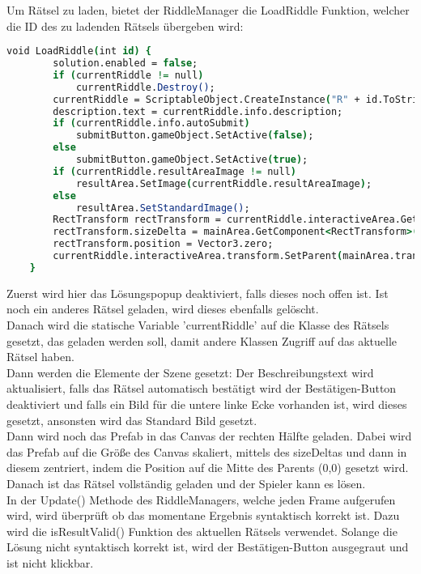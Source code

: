 Um Rätsel zu laden, bietet der RiddleManager die LoadRiddle Funktion, welcher die ID des zu ladenden Rätsels übergeben wird:

\begin{lstlisting}[language=csh, caption={LoadRiddle() Methode des RätselManagers}]
void LoadRiddle(int id) {
        solution.enabled = false;
        if (currentRiddle != null)
            currentRiddle.Destroy();
        currentRiddle = ScriptableObject.CreateInstance("R" + id.ToString("000")) as Riddle;
        description.text = currentRiddle.info.description;
        if (currentRiddle.info.autoSubmit)
            submitButton.gameObject.SetActive(false);
        else
            submitButton.gameObject.SetActive(true);
        if (currentRiddle.resultAreaImage != null)
            resultArea.SetImage(currentRiddle.resultAreaImage);
        else
            resultArea.SetStandardImage();
        RectTransform rectTransform = currentRiddle.interactiveArea.GetComponent<RectTransform>();
        rectTransform.sizeDelta = mainArea.GetComponent<RectTransform>().rect.size;
        rectTransform.position = Vector3.zero;
        currentRiddle.interactiveArea.transform.SetParent(mainArea.transform, false);
    }
\end{lstlisting}
Zuerst wird hier das Lösungspopup deaktiviert, falls dieses noch offen ist. Ist noch ein anderes Rätsel geladen, wird dieses ebenfalls gelöscht.\\
Danach wird die statische Variable 'currentRiddle' auf die Klasse des Rätsels gesetzt, das geladen werden soll, damit andere Klassen Zugriff auf das aktuelle Rätsel haben.\\
Dann werden die Elemente der Szene gesetzt: Der Beschreibungstext wird aktualisiert, falls das Rätsel automatisch bestätigt wird der Bestätigen-Button deaktiviert und falls ein Bild für die untere linke Ecke vorhanden ist, wird dieses gesetzt, ansonsten wird das Standard Bild gesetzt.\\
Dann wird noch das Prefab in das Canvas der rechten Hälfte geladen. Dabei wird das Prefab auf die Größe des Canvas skaliert, mittels des sizeDeltas und dann in diesem zentriert, indem die Position auf die Mitte des Parents (0,0) gesetzt wird.\\
Danach ist das Rätsel vollständig geladen und der Spieler kann es lösen.\\

In der Update() Methode des RiddleManagers, welche jeden Frame aufgerufen wird, wird überprüft ob das momentane Ergebnis syntaktisch korrekt ist. Dazu wird die isResultValid() Funktion des aktuellen Rätsels verwendet. Solange die Lösung nicht syntaktisch korrekt ist, wird der Bestätigen-Button ausgegraut und ist nicht klickbar.\\

